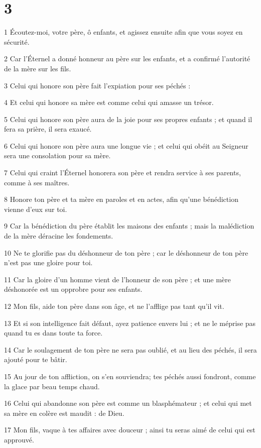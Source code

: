 \chapter{3}

\par 1 Écoutez-moi, votre père, ô enfants, et agissez ensuite afin que vous soyez en sécurité.
\par 2 Car l'Éternel a donné honneur au père sur les enfants, et a confirmé l'autorité de la mère sur les fils.
\par 3 Celui qui honore son père fait l'expiation pour ses péchés :
\par 4 Et celui qui honore sa mère est comme celui qui amasse un trésor.
\par 5 Celui qui honore son père aura de la joie pour ses propres enfants ; et quand il fera sa prière, il sera exaucé.
\par 6 Celui qui honore son père aura une longue vie ; et celui qui obéit au Seigneur sera une consolation pour sa mère.
\par 7 Celui qui craint l'Éternel honorera son père et rendra service à ses parents, comme à ses maîtres.
\par 8 Honore ton père et ta mère en paroles et en actes, afin qu'une bénédiction vienne d'eux sur toi.
\par 9 Car la bénédiction du père établit les maisons des enfants ; mais la malédiction de la mère déracine les fondements.
\par 10 Ne te glorifie pas du déshonneur de ton père ; car le déshonneur de ton père n'est pas une gloire pour toi.
\par 11 Car la gloire d'un homme vient de l'honneur de son père ; et une mère déshonorée est un opprobre pour ses enfants.
\par 12 Mon fils, aide ton père dans son âge, et ne l'afflige pas tant qu'il vit.
\par 13 Et si son intelligence fait défaut, ayez patience envers lui ; et ne le méprise pas quand tu es dans toute ta force.
\par 14 Car le soulagement de ton père ne sera pas oublié, et au lieu des péchés, il sera ajouté pour te bâtir.
\par 15 Au jour de ton affliction, on s'en souviendra; tes péchés aussi fondront, comme la glace par beau temps chaud.
\par 16 Celui qui abandonne son père est comme un blasphémateur ; et celui qui met sa mère en colère est maudit : de Dieu.
\par 17 Mon fils, vaque à tes affaires avec douceur ; ainsi tu seras aimé de celui qui est approuvé.
